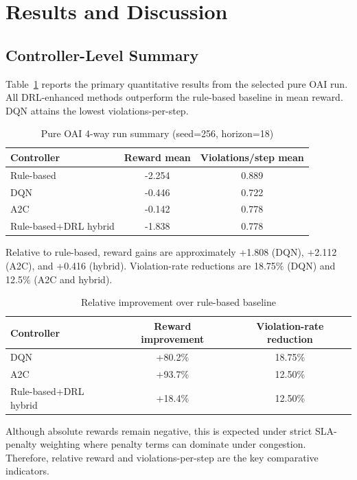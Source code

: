 \documentclass[journal]{IEEEtran}
\begin{document}
\section{Results and Discussion}
\subsection{Controller-Level Summary}
Table~\ref{tab:controller-summary} reports the primary quantitative results from the selected pure OAI run. All DRL-enhanced methods outperform the rule-based baseline in mean reward. DQN attains the lowest violations-per-step.

\begin{table}[t]
\caption{Pure OAI 4-way run summary (seed=256, horizon=18)}
\label{tab:controller-summary}
\centering
\begin{tabular}{lcc}
\toprule
Controller & Reward mean & Violations/step mean \\
\midrule
Rule-based & -2.254 & 0.889 \\
DQN & -0.446 & 0.722 \\
A2C & -0.142 & 0.778 \\
Rule-based+DRL hybrid & -1.838 & 0.778 \\
\bottomrule
\end{tabular}
\end{table}

Relative to rule-based, reward gains are approximately +1.808 (DQN), +2.112 (A2C), and +0.416 (hybrid). Violation-rate reductions are 18.75\% (DQN) and 12.5\% (A2C and hybrid).

\begin{table}[t]
\caption{Relative improvement over rule-based baseline}
\label{tab:relative-improvement}
\centering
\begin{tabular}{lcc}
\toprule
Controller & Reward improvement & Violation-rate reduction \\
\midrule
DQN & +80.2\% & 18.75\% \\
A2C & +93.7\% & 12.50\% \\
Rule-based+DRL hybrid & +18.4\% & 12.50\% \\
\bottomrule
\end{tabular}
\end{table}

Although absolute rewards remain negative, this is expected under strict SLA-penalty weighting where penalty terms can dominate under congestion. Therefore, relative reward and violations-per-step are the key comparative indicators.
\end{document}

